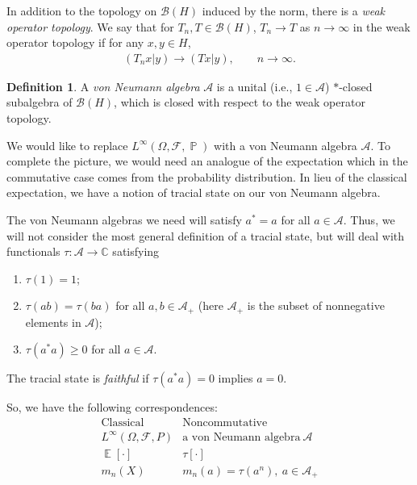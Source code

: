 \documentclass[letterpaper,11pt,oneside,reqno]{amsart}
\numberwithin{equation}{section}
\DeclareMathOperator{\EE}{\mathbb{E}}
\DeclareMathOperator{\PP}{\mathbb{P}}
\theoremstyle{definition}
\newtheorem{definition}[proposition]{Definition}
\begin{document}
In addition to the topology on $\mathcal{B}(H)$ induced by the norm, there is a \emph{weak operator topology}. We say that for $T_n, T\in \mathcal{B}(H)$, $T_n\to T$ as $n\to\infty$
in the weak operator topology if for any $x,y\in H$,
\begin{align*}
    (T_nx|y)\to (Tx|y),\qquad n\to\infty.
\end{align*}
\begin{definition}
	A \emph{von Neumann algebra} $\mathcal{A}$
	is a unital (i.e., $1\in\mathcal{A}$) $*$-closed subalgebra 
	of $\mathcal{B}(H)$, which is closed with respect to the weak operator topology.
\end{definition}
We would
like to replace $L^\infty(\Omega, \mathcal{F}, \PP)$ with a von Neumann algebra $\mathcal{A}$.
To complete the picture, we would need an analogue of the expectation
which in the commutative case comes from the probability distribution.
In lieu of the classical expectation, we have a notion of tracial state on our von Neumann algebra. 

The von Neumann algebras we need will satisfy $a^*=a$ for all $a\in\mathcal{A}$. Thus,
we will not consider the most general definition of a tracial state, but will deal with functionals
$\tau\colon \mathcal{A}\to\mathbb{C}$ satisfying
\begin{enumerate}
    \item $\tau(1)=1$;
    \item $\tau(ab)=\tau(ba)$ for all $a,b\in\mathcal{A}_+$ (here $\mathcal{A}_+$
    is the subset of nonnegative elements in $\mathcal{A}$);
    \item $\tau(a^*a)\ge0$ for all $a\in\mathcal{A}$.
\end{enumerate}
The tracial state is \emph{faithful} if $\tau(a^*a)=0$ implies $a=0$.

So, we have the following correspondences:
\begin{equation*}
\begin{array}{c|c}
    \text{Classical} & \text{Noncommutative} \\ \hline
     L^\infty(\Omega, \mathcal{F}, P) & \text{a von Neumann algebra} \ \mathcal{A}\\
     \EE[\cdot] & \tau[\cdot]\\
     m_n(X) & m_n(a)=\tau(a^n),\ a\in \mathcal{A}_+
\end{array}	
\end{equation*}
\end{document}
